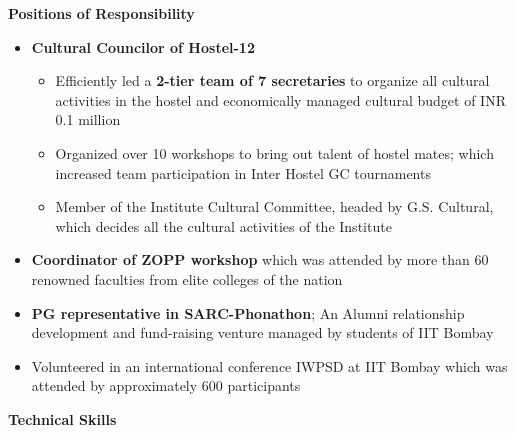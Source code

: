 \documentclass[a4paper,11pt,times]{res}
\newcommand{\smalitem}[1]{\item #1 \vspace{-4pt}}
\newcommand{\resheading}[1]{{\large \colorbox{mygrey}{\begin{minipage}{\textwidth}{\textbf{#1 \vphantom{p\^{E}}}}\end{minipage}}\vspace{4pt}}}
\begin{document}
\resheading{Positions of Responsibility}
\begin{itemize}

\smalitem{
 {\bf Cultural Councilor of Hostel-12}
\begin{itemize}
\smalitem{\vspace{-5 pt}Efficiently led a {\bf 2-tier team of 7 secretaries} to organize all cultural activities in the hostel and economically managed cultural budget of INR 0.1 million }
\smalitem{Organized over 10 workshops to bring out talent of hostel mates; which increased team participation in Inter Hostel GC tournaments}
\smalitem{Member of the Institute Cultural Committee, headed by G.S. Cultural, which decides all the cultural activities of the Institute }
\end{itemize}
}
\smalitem{
	 {\bf Coordinator of ZOPP workshop} which was attended by more than 60 renowned faculties from elite colleges of the nation}
\smalitem {{\bf PG representative in SARC-Phonathon}; An Alumni relationship development and fund-raising venture managed by students of IIT Bombay}
\smalitem{
	Volunteered in an international conference IWPSD at IIT Bombay which was attended by approximately 600 participants}
\end{itemize}
\resheading{Technical Skills}
\end{document}
